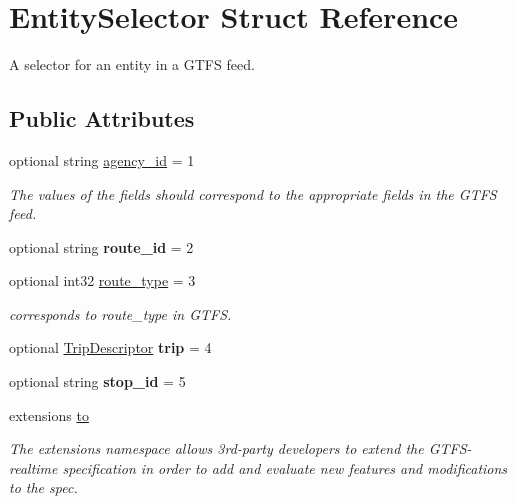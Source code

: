 \hypertarget{structEntitySelector}{}\section{Entity\+Selector Struct Reference}
\label{structEntitySelector}


A selector for an entity in a G\+T\+FS feed.  


\subsection*{Public Attributes}
\begin{DoxyCompactItemize}
\item 
optional string \hyperlink{structEntitySelector_acbe496a1b62f72e17ef0c274a0c9ad5f}{agency\+\_\+id} = 1
\begin{DoxyCompactList}\small\item\em The values of the fields should correspond to the appropriate fields in the G\+T\+FS feed. \end{DoxyCompactList}\item 
optional string {\bfseries route\+\_\+id} = 2\hypertarget{structEntitySelector_af8ad6e85795c182d0f28758f3216518a}{}\label{structEntitySelector_af8ad6e85795c182d0f28758f3216518a}

\item 
optional int32 \hyperlink{structEntitySelector_a92edd149876ba43d4ca8e79e7080e5cd}{route\+\_\+type} = 3\hypertarget{structEntitySelector_a92edd149876ba43d4ca8e79e7080e5cd}{}\label{structEntitySelector_a92edd149876ba43d4ca8e79e7080e5cd}

\begin{DoxyCompactList}\small\item\em corresponds to route\+\_\+type in G\+T\+FS. \end{DoxyCompactList}\item 
optional \hyperlink{structTripDescriptor}{Trip\+Descriptor} {\bfseries trip} = 4\hypertarget{structEntitySelector_a06a0e81adbeba4a8f546a10649725e71}{}\label{structEntitySelector_a06a0e81adbeba4a8f546a10649725e71}

\item 
optional string {\bfseries stop\+\_\+id} = 5\hypertarget{structEntitySelector_ace89399c589145cf36fb611e1248005d}{}\label{structEntitySelector_ace89399c589145cf36fb611e1248005d}

\item 
extensions \hyperlink{structEntitySelector_a15a176a7bc347ec95f0ffbfa47ee2c47}{to}
\begin{DoxyCompactList}\small\item\em The extensions namespace allows 3rd-\/party developers to extend the G\+T\+F\+S-\/realtime specification in order to add and evaluate new features and modifications to the spec. \end{DoxyCompactList}\end{DoxyCompactItemize}


